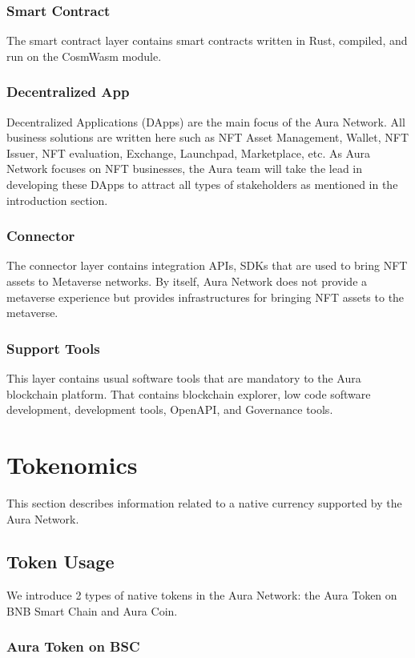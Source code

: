 \documentclass[11pt, titlepage]{article}
\begin{document}
\subsubsection*{Smart Contract}
The smart contract layer contains smart contracts written in Rust, compiled, and run on the CosmWasm module.

\subsubsection*{Decentralized App}
Decentralized Applications (DApps) are the main focus of the Aura Network. All business solutions are written here such as NFT Asset Management, Wallet, NFT Issuer, NFT evaluation, Exchange, Launchpad, Marketplace, etc. As Aura Network focuses on NFT businesses, the Aura team will take the lead in developing these DApps to attract all types of stakeholders as mentioned in the introduction section.

\subsubsection*{Connector}
The connector layer contains integration APIs, SDKs that are used to bring NFT assets to Metaverse networks. By itself, Aura Network does not provide a metaverse experience but provides infrastructures for bringing NFT assets to the metaverse.

\subsubsection*{Support Tools}
This layer contains usual software tools that are mandatory to the Aura blockchain platform. That contains blockchain explorer, low code software development, development tools, OpenAPI, and Governance tools.

\section{Tokenomics}

This section describes information related to a native currency supported by the Aura Network.

\subsection{Token Usage}
We introduce 2 types of native tokens in the Aura Network: the Aura Token on BNB Smart Chain and Aura Coin.

\subsubsection{Aura Token on BSC}
\end{document}

